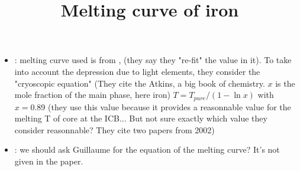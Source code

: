 \documentclass{article}
\title{Melting curve of iron}
\begin{document}
\maketitle

\begin{itemize}
    \item \citet{stixrude2014melting} : melting curve used is from \citet{morard2011melting}, (they say they "re-fit" the value in it). To take into account the depression due to light elements, they consider the "cryoscopic equation" (They cite the Atkins, a big book of chemistry. $x$ is the mole fraction of the main phase, here iron) $T=T_{pure}/(1-\ln x)$ with $x=0.89$ (they use this value because it provides a reasonnable value for the melting T of core at the ICB... But not sure exactly which value they consider reasonnable? They cite two papers from 2002)
    \item \citet{morard2011melting} : we should ask Guillaume for the equation of the melting curve? It's not given in the paper.
\end{itemize}



\end{document}

